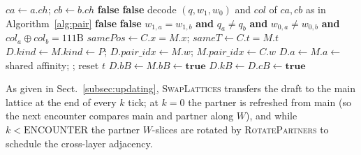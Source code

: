 \documentclass{ijuc}
\begin{document}
\begin{algorithm}[ht]
\caption{cluster formation, electric/magnetic channels, and collapse (superposing and distinct bubbles).}
\label{alg:cluster}
\begin{algorithmic}[1]
\State $ca \gets a.ch$; $cb \gets b.ch$
 
\State \Return \textbf{false}
 
\State \Return \textbf{false}
\EndIf
\State decode $(q,w_{1},w_{0})$ and $col$ of $ca,cb$ as in Algorithm~\ref{alg:pair}
 
\State \Return \textbf{false}
 
\State \Return \textbf{false}
\EndIf
\State \Return $w_{1,a} = w_{1,b}$ \textbf{and} $q_a \neq q_b$ \textbf{and} $w_{0,a} \neq w_{0,b}$ \textbf{and} $col_a \oplus col_b = 111\mathrm{B}$ 
\EndFunction
{}
\State $samePos \gets C.x = M.x$; $sameT \gets C.t = M.t$
\State $D.kind \gets M.kind \gets P$; $D.pair\_idx \gets M.w$; $M.pair\_idx \gets C.w$ 
\State $D.a \gets M.a \gets$ shared affinity; ; reset $t$
\State $D.bB \gets M.bB \gets \textbf{true}$ 
\EndIf
{} 
 
\State $D.kB \gets D.cB \gets \textbf{true}$ 
\Else
\State {} 
\EndIf
\EndIf
\EndProcedure
\end{algorithmic}
\end{algorithm}
As given in Sect.~\ref{subsec:updating}, \textsc{SwapLattices} transfers the draft to the main lattice at the end of every $k$ tick; at $k=0$ the partner is refreshed from main (so the next encounter compares main and partner along $W$), and while $k<\mathrm{ENCOUNTER}$ the partner $W$-slices are rotated by \textsc{RotatePartners} to schedule the cross-layer adjacency.
\end{document}
